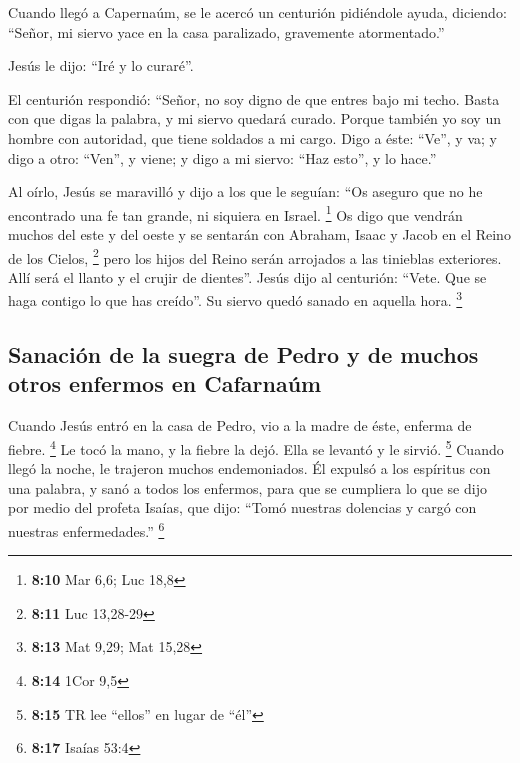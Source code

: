 \begin{paracol}{2}
 Cuando llegó a Capernaúm, se le acercó un centurión
pidiéndole ayuda,  diciendo: ``Señor, mi siervo yace en la
casa paralizado, gravemente atormentado.''

 Jesús le dijo: ``Iré y lo curaré''.

 El centurión respondió: ``Señor, no soy digno de que
entres bajo mi techo. Basta con que digas la palabra, y mi siervo
quedará curado.  Porque también yo soy un hombre con
autoridad, que tiene soldados a mi cargo. Digo a éste: ``Ve'', y va; y
digo a otro: ``Ven'', y viene; y digo a mi siervo: ``Haz esto'', y lo
hace.''

 Al oírlo, Jesús se maravilló y dijo a los que le
seguían: ``Os aseguro que no he encontrado una fe tan grande, ni
siquiera en Israel. \footnote{\textbf{8:10} Mar 6,6; Luc 18,8}
 Os digo que vendrán muchos del este y del oeste y se
sentarán con Abraham, Isaac y Jacob en el Reino de los Cielos,
\footnote{\textbf{8:11} Luc 13,28-29}  pero los hijos del
Reino serán arrojados a las tinieblas exteriores. Allí será el llanto y
el crujir de dientes''.  Jesús dijo al centurión: ``Vete.
Que se haga contigo lo que has creído''. Su siervo quedó sanado en
aquella hora. \footnote{\textbf{8:13} Mat 9,29; Mat 15,28}

\hypertarget{sanaciuxf3n-de-la-suegra-de-pedro-y-de-muchos-otros-enfermos-en-cafarnauxfam}{%
\subsection{Sanación de la suegra de Pedro y de muchos otros enfermos en
Cafarnaúm}\label{sanaciuxf3n-de-la-suegra-de-pedro-y-de-muchos-otros-enfermos-en-cafarnauxfam}}

 Cuando Jesús entró en la casa de Pedro, vio a la madre
de éste, enferma de fiebre. \footnote{\textbf{8:14} 1Cor 9,5}
 Le tocó la mano, y la fiebre la dejó. Ella se levantó y
le sirvió. \footnote{\textbf{8:15} TR lee ``ellos'' en lugar de ``él''}
 Cuando llegó la noche, le trajeron muchos endemoniados.
Él expulsó a los espíritus con una palabra, y sanó a todos los enfermos,
 para que se cumpliera lo que se dijo por medio del
profeta Isaías, que dijo: ``Tomó nuestras dolencias y cargó con nuestras
enfermedades.'' \footnote{\textbf{8:17} Isaías 53:4}

\hypertarget{jesuxfas-escapa-a-la-otra-orilla-del-lago-proverbios-sobre-seguir-a-jesuxfas}{%
}
\end{paracol}
